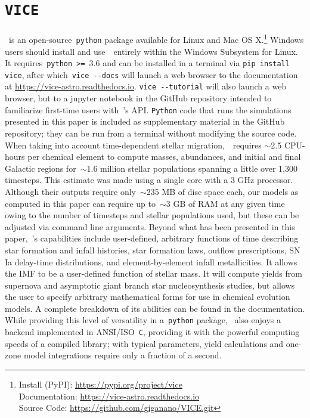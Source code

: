 \documentclass[draft2.tex]{subfiles}
\begin{document}
 

\section{\texttt{VICE}} 
\label{sec:vice} 

\vice~is an open-source~\texttt{python} package available for Linux and Mac OS 
X.\footnote{ 
	Install (PyPI): \url{https://pypi.org/project/vice} \\ 
	Documentation: \url{https://vice-astro.readthedocs.io} \\ 
	Source Code: \url{https://github.com/giganano/VICE.git} 
} 
Windows users should install and use~\vice~entirely within the Windows Subsystem 
for Linux. 
It requires~\texttt{python >=}~3.6 and can be installed in a terminal via 
\texttt{pip install vice}, after which~\texttt{vice -{}-docs} will launch a web 
browser to the documentation at \url{https://vice-astro.readthedocs.io}. 
\texttt{vice -{}-tutorial} will also 
launch a web browser, but to a jupyter notebook in the GitHub repository 
intended to familiarize first-time users with~\vice's API. 
\texttt{Python} code that runs the simulations presented in this paper is 
included as supplementary material in the GitHub repository; they can be run 
from a terminal without modifying the source code. 
When taking into account time-dependent stellar migration,~\vice~requires 
$\sim$2.5 CPU-hours per chemical element to compute masses, abundances, and 
initial and final Galactic regions for~$\sim$1.6 million stellar populations 
spanning a little over 1,300 timesteps. 
This estimate was made using a single core with a 3 GHz processor. 
Although their outputs require only~$\sim$235 MB of disc space each, our models 
as computed in this paper can require up to~$\sim$3 GB of RAM at any given 
time owing to the number of timesteps and stellar populations used, but these 
can be adjusted via command line arguments. 
Beyond what has been presented in this paper,~\vice's capabilities include 
user-defined, arbitrary functions of time describing star formation and infall 
histories, star formation laws, outflow prescriptions, SN Ia delay-time 
distributions, and element-by-element infall metallicities. 
It allows the IMF to be a user-defined function of stellar mass. 
It will compute yields from supernova and asymptotic giant branch star 
nucleosynthesis studies, but allows the user to specify arbitrary mathematical 
forms for use in chemical evolution models. 
A complete breakdown of its abilities can be found in the documentation. 
While providing this level of versatility in a~\texttt{python} package, 
\vice~also enjoys a backend implemented in ANSI/ISO~\texttt{C}, providing it 
with the powerful computing speeds of a compiled library; with typical 
parameters, yield calculations and one-zone model integrations require only a 
fraction of a second. 
\end{document}
